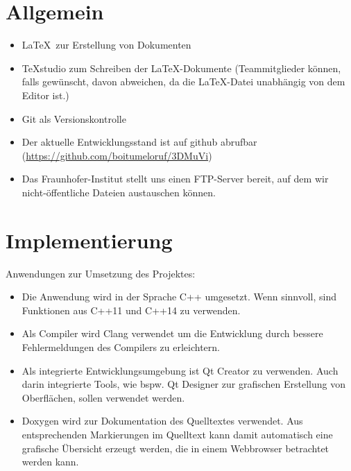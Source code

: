 
\section{Allgemein}
	\begin{itemize}
		\item \LaTeX\ zur Erstellung von Dokumenten
		\item TeXstudio zum Schreiben der \LaTeX-Dokumente (Teammitglieder können, falls gewünscht, davon abweichen, da die \LaTeX-Datei unabhängig von dem Editor ist.)
		\item Git als Versionskontrolle
		\item Der aktuelle Entwicklungsstand ist auf github abrufbar
		\newline(\href{https://github.com/boitumeloruf/3DMuVi}{https://github.com/boitumeloruf/3DMuVi})
		\item Das Fraunhofer-Institut stellt uns einen FTP-Server bereit, auf dem wir nicht-öffentliche Dateien austauschen können.
	\end{itemize}
\section{Implementierung}
	Anwendungen zur Umsetzung des Projektes:
	\begin{itemize}
		\item Die Anwendung wird in der Sprache C++ umgesetzt. Wenn sinnvoll, sind Funktionen aus C++11 und C++14 zu verwenden.
		\item Als Compiler wird Clang verwendet um die Entwicklung durch bessere Fehlermeldungen des Compilers zu erleichtern.
		\item Als integrierte Entwicklungsumgebung ist Qt Creator zu verwenden. Auch darin integrierte Tools, wie bspw. Qt Designer zur grafischen Erstellung von Oberflächen, sollen verwendet werden.
		\item Doxygen wird zur Dokumentation des Quelltextes verwendet. Aus entsprechenden Markierungen im Quelltext kann damit automatisch eine grafische Übersicht erzeugt werden, die in einem Webbrowser betrachtet werden kann.
	\end{itemize}
